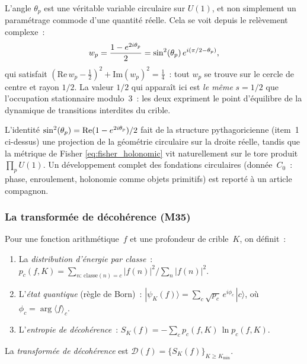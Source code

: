 \documentclass[12pt,a4paper]{article}
\begin{document}
\begin{remarque}\mBR
\label{rem:circular_reading}
L'angle $\theta_p$ est une véritable variable circulaire sur $U(1)$,
et non simplement un paramétrage commode d'une quantité réelle. Cela
se voit depuis le relèvement complexe~:
\begin{equation}
  w_p = \frac{1 - e^{2i\theta_p}}{2}
  = \sin^2(\theta_{p})\,e^{i(\pi/2 - \theta_p)},
  \label{eq:complex_lift}
\end{equation}
qui satisfait $(\mathrm{Re}\,w_p - \tfrac{1}{2})^2
+ \mathrm{Im}(w_p)^2 = \tfrac{1}{4}$~: tout $w_p$ se trouve sur le
cercle de centre et rayon $1/2$. La valeur $1/2$ qui apparaît ici est
\emph{le même} $s = 1/2$ que l'occupation stationnaire modulo~3~:
les deux expriment le point d'équilibre de la dynamique de
transitions interdites du crible.

L'identité $\sin^2(\theta_{p}) = \mathrm{Re}(1 - e^{2i\theta_p})/2$ fait de la
structure pythagoricienne (item~1 ci-dessus) une projection de la
géométrie circulaire sur la droite réelle, tandis que la métrique de
Fisher \eqref{eq:fisher_holonomic} vit naturellement sur le tore
produit $\prod_p U(1)$. Un développement complet des fondations
circulaires (donnée~$C_0$~: phase, enroulement, holonomie comme
objets primitifs) est reporté à un article compagnon.
\end{remarque}

\subsubsection{La transformée de décohérence (M35)}
\label{sec:ms_decoherence_transform}

\begin{definition}
\label{def:decoherence_transform}
Pour une fonction arithmétique~$f$ et une profondeur de crible~$K$,
on définit~:
\begin{enumerate}[nosep]
\item La \emph{distribution d'énergie par classe}~:
  $p_c(f,K) = \sum_{n:\,\mathrm{classe}(n)=c} |f(n)|^2
   \big/ \sum_n |f(n)|^2$.
\item L'\emph{état quantique} (règle de Born)~:
  $|\psi_K(f)\rangle = \sum_c \sqrt{p_c}\,e^{i\phi_c}\,|c\rangle$,
  où $\phi_c = \arg\langle f \rangle_c$.
\item L'\emph{entropie de décohérence}~:
  $S_K(f) = -\sum_c p_c(f,K)\,\ln p_c(f,K)$.
\end{enumerate}
La \emph{transformée de décohérence} est $\mathcal{D}(f)
= \{S_K(f)\}_{K \geq K_{\min}}$.
\end{definition}
\end{document}
